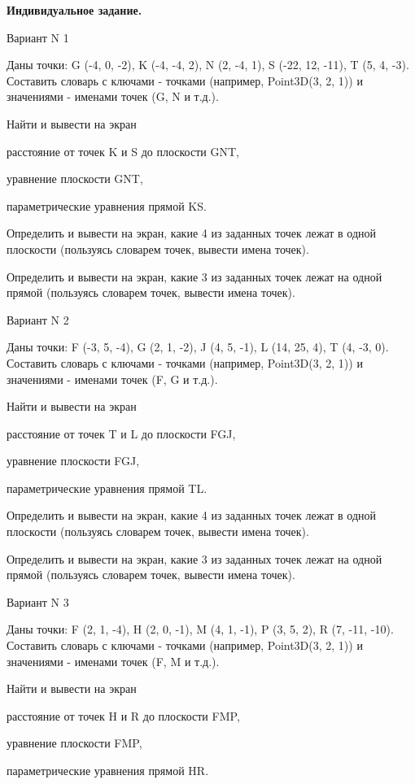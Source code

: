 \documentclass[11pt]{report}
\begin{document}
\pagestyle{empty}

{\bf Индивидуальное задание.}

Вариант N 1

Даны точки: G (-4, 0, -2), K (-4, -4, 2), N (2, -4, 1), S (-22, 12, -11), T (5, 4, -3).
Составить словарь с ключами - точками (например, Point3D(3, 2, 1)) и значениями - именами точек (G, N и т.д.).


Найти и вывести на экран


расстояние от точек K и S до плоскости GNT,


уравнение плоскости GNT,


параметрические уравнения прямой KS.


Определить и вывести на экран, какие 4 из заданных точек лежат в одной плоскости (пользуясь словарем точек, вывести имена точек).


Определить и вывести на экран, какие 3 из заданных точек лежат на одной прямой (пользуясь словарем точек, вывести имена точек).

\newpage
Вариант N 2

Даны точки: F (-3, 5, -4), G (2, 1, -2), J (4, 5, -1), L (14, 25, 4), T (4, -3, 0).
Составить словарь с ключами - точками (например, Point3D(3, 2, 1)) и значениями - именами точек (F, G и т.д.).


Найти и вывести на экран


расстояние от точек T и L до плоскости FGJ,


уравнение плоскости FGJ,


параметрические уравнения прямой TL.


Определить и вывести на экран, какие 4 из заданных точек лежат в одной плоскости (пользуясь словарем точек, вывести имена точек).


Определить и вывести на экран, какие 3 из заданных точек лежат на одной прямой (пользуясь словарем точек, вывести имена точек).

\newpage
Вариант N 3

Даны точки: F (2, 1, -4), H (2, 0, -1), M (4, 1, -1), P (3, 5, 2), R (7, -11, -10).
Составить словарь с ключами - точками (например, Point3D(3, 2, 1)) и значениями - именами точек (F, M и т.д.).


Найти и вывести на экран


расстояние от точек H и R до плоскости FMP,


уравнение плоскости FMP,


параметрические уравнения прямой HR.
\end{document}
